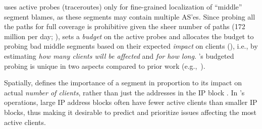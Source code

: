 
{\name} uses active probes (traceroutes) only for fine-grained localization of ``middle'' segment blames, as these segments may contain multiple AS'es. Since probing all the paths for full coverage is prohibitive given the sheer number of paths (172 million per day; ), {\name} sets a {\em budget} on the active probes and allocates the budget to probing bad middle segments based on their expected {\em impact} on clients (), i.e., by estimating {\em how many clients will be affected} and {\em for how long}. %
{\name}'s budgeted probing is unique in two aspects compared to prior work (e.g.,~\cite{zhang2004planetseer, 35590, madhyastha2006iplane}).

Spatially, {\name} defines the importance of a segment in proportion to its impact on actual {\em number of clients}, rather than just the addresses in the IP block \cite{35590}. In {\azure}'s operations, large IP address blocks often have fewer active clients than smaller IP blocks, thus making it desirable to predict and prioritize issues affecting the most active clients.

